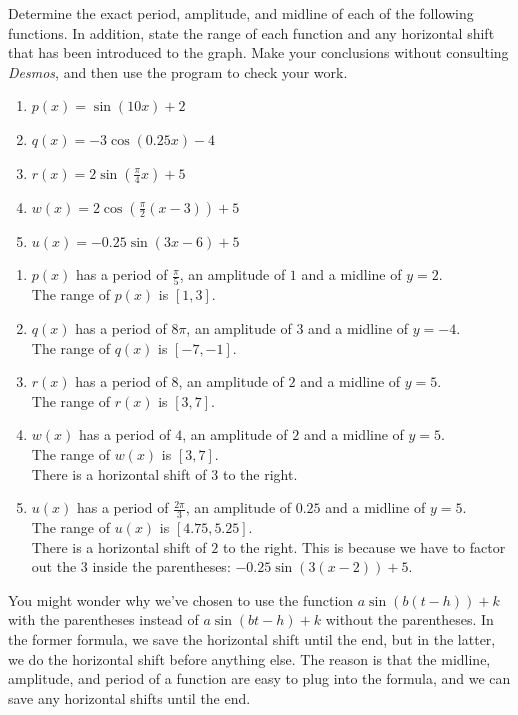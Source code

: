 \documentclass{ximera}
\begin{document}
\begin{example}
Determine the exact period, amplitude, and midline of each of the following functions.  In addition,  state the range of each function and any horizontal shift that has been introduced to the graph.  Make your conclusions without consulting \emph{Desmos}, and then use the program to check your work.%

\begin{enumerate}[label=\alph*.]
\item
\(p(x) = \sin(10x) + 2\)%
\item
\(q(x) = -3\cos(0.25x) - 4\)%
\item
\(r(x) = 2\sin\left( \frac{\pi}{4} x\right) + 5\)%
\item
\(w(x) = 2\cos\left( \frac{\pi}{2} (x-3) \right) + 5\)%
\item
\(u(x) = -0.25\sin\left(3x-6\right) + 5\)%
\end{enumerate}
\begin{explanation}
\begin{enumerate}[label=\alph*.]
\item
$p(x)$ has a period of $\frac{\pi}{5}$, an amplitude of $1$ and a midline of $y=2$. \\
The range of $p(x)$ is $[1,3]$.
\item
$q(x)$ has a period of $8\pi$, an amplitude of $3$ and a midline of $y=-4$. \\
The range of $q(x)$ is $[-7, -1]$.
\item
$r(x)$ has a period of $8$, an amplitude of $2$ and a midline of $y=5$. \\
 The range of $r(x)$ is $[3, 7]$.
\item
$w(x)$ has a period of $4$, an amplitude of $2$ and a midline of $y=5$.\\
The range of $w(x)$ is $[3, 7]$. \\
There is a horizontal shift of $3$ to the right.
\item
$u(x)$ has a period of $\frac{2\pi}{3}$, an amplitude of $0.25$ and a midline of $y=5$. \\
The range of $u(x)$ is $[4.75, 5.25]$. \\
There is a horizontal shift of $2$ to the right. This is because we have to factor out the 3 inside the parentheses: $-0.25\sin(3(x - 2)) + 5$. 
\end{enumerate}
\end{explanation}

You might wonder why we've chosen to use the function $a\sin(b(t-h)) + k$ with the parentheses instead of $a\sin(bt - h) + k$ without the parentheses. In the former formula, we save the horizontal shift until the end, but in the latter, we do the horizontal shift before anything else. The reason is that the midline, amplitude, and period of a function are easy to plug into the formula, and we can save any horizontal shifts until the end. 

\end{example}
\end{document}
